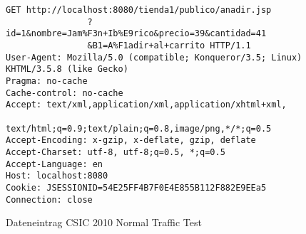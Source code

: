 \begin{figure}[h]
  \centering
        \caption{Dateneintrag CSIC 2010 Normal Traffic Test}
        \label{fig:ccex}
        \begin{lstlisting}[basicstyle=\footnotesize]
GET http://localhost:8080/tienda1/publico/anadir.jsp
                ?id=1&nombre=Jam%F3n+Ib%E9rico&precio=39&cantidad=41
                &B1=A%F1adir+al+carrito HTTP/1.1
User-Agent: Mozilla/5.0 (compatible; Konqueror/3.5; Linux) KHTML/3.5.8 (like Gecko)
Pragma: no-cache
Cache-control: no-cache
Accept: text/xml,application/xml,application/xhtml+xml,
                text/html;q=0.9;text/plain;q=0.8,image/png,*/*;q=0.5
Accept-Encoding: x-gzip, x-deflate, gzip, deflate
Accept-Charset: utf-8, utf-8;q=0.5, *;q=0.5
Accept-Language: en
Host: localhost:8080
Cookie: JSESSIONID=54E25FF4B7F0E4E855B112F882E9EEa5
Connection: close
\end{lstlisting}
\end{figure}

